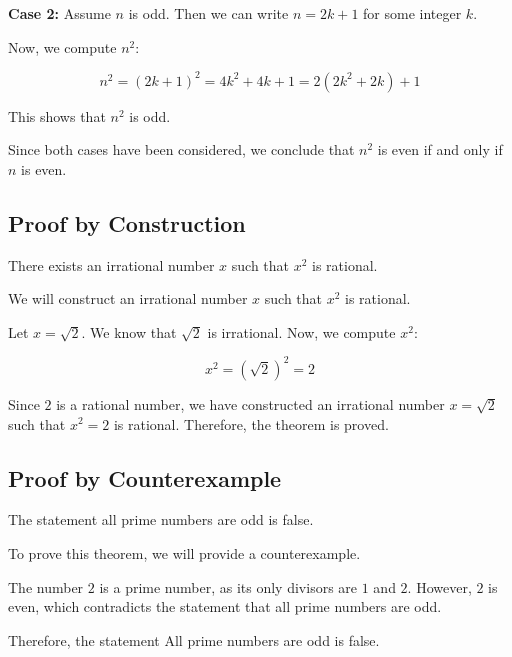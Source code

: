 \textbf{Case 2:} Assume \( n \) is odd. Then we can write \( n = 2k + 1 \) for some integer \( k \).
\vspace{\baselineskip}

Now, we compute \( n^2 \):

\[
	n^2 = {(2k + 1)}^2 = 4k^2 + 4k + 1 = 2(2k^2 + 2k) + 1
\]

This shows that \( n^2 \) is odd.
\vspace{\baselineskip}

Since both cases have been considered, we conclude that \( n^2 \) is even if and only if \( n \) is even.

\QED

\subsection{Proof by Construction}

There exists an irrational number \( x \) such that \( x^2 \) is rational.
\vspace{\baselineskip}

We will construct an irrational number \( x \) such that \( x^2 \) is rational.
\vspace{\baselineskip}

Let \( x = \sqrt{2} \). We know that \( \sqrt{2} \) is irrational. Now, we compute \( x^2 \):
	
\[
	x^2 = (\sqrt{2})^2 = 2
\]
	
Since \( 2 \) is a rational number, we have constructed an irrational number \( x = \sqrt{2} \) such that \( x^2 = 2 \) is rational.
Therefore, the theorem is proved.

\QED

\subsection{Proof by Counterexample}

The statement all prime numbers are odd is false.
\vspace{\baselineskip}

To prove this theorem, we will provide a counterexample.
\vspace{\baselineskip}

The number \( 2 \) is a prime number, as its only divisors are \( 1 \) and \( 2 \). However, \( 2 \) is even, which contradicts the statement that all prime numbers are odd.
\vspace{\baselineskip}

Therefore, the statement All prime numbers are odd is false.
\QED

